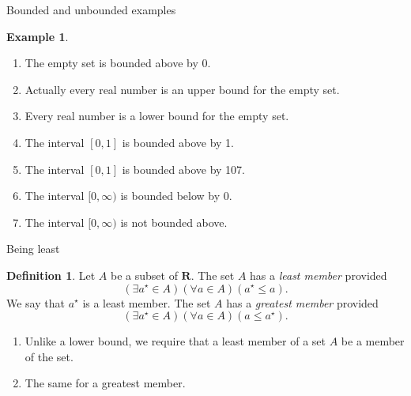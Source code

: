 \documentclass[fleqn]{beamer}
\newcommand{\reals}{\mathbf{R}}
\theoremstyle{definition}
\newtheorem{mydef}{Definition}
\newtheorem{myex}{Example}
\newenvironment{numberlist}
   {\begin{enumerate}[(1)]
       \addtolength{\itemsep}{-0.5\itemsep}}
     {\end{enumerate}}
\begin{document}
\begin{frame}{Bounded and unbounded examples}

\begin{myex}
  \begin{numberlist}
    \item The empty set is bounded above by 0.
    \vspace{0.15in}
      \item Actually every real number is an upper bound for the empty set.
      \vspace{0.15in}
      \item Every real number is a lower bound for the empty set.
      \vspace{0.15in}
   \item The interval \([0,1] \) is bounded above by 1.
   \vspace{0.15in}
   \item The interval \([0,1] \) is bounded above by 107.
   \vspace{0.15in}
   \item The interval \([0,\infty) \) is bounded below by 0.
   \vspace{0.15in}
   \item The interval \([0,\infty) \) is not bounded above.
\end{numberlist}
\end{myex}

\end{frame}




\begin{frame}{Being least}
\begin{mydef} Let \(A\) be a subset of \(\reals\). The set \(A\) has a \emph{least member} provided
  \[
     \left (\exists a^\star \in A \right) \left( \forall a \in A \right)
     (a^\star \leq a).
  \]
  We say that \(a^\star\) is a least member.  The set \(A\) has a \emph{greatest
  member} provided
  \[
     \left (\exists a^\star \in A \right) \left( \forall a \in A \right)
     (a \leq a^\star).
  \]
  \end{mydef}


\begin{numberlist}
 \item Unlike a lower bound, we require that a least member of a set \(A\) be a member of the set.

 \vspace{0.15in}

 \item The same for a greatest member.
\end{numberlist}

\end{frame}
\end{document}
